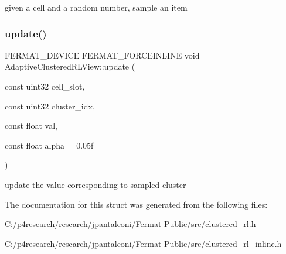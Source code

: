 given a cell and a random number, sample an item \mbox{\label{struct_adaptive_clustered_r_l_view_a2d22060ad6f9a30598f0ad657bf73171}} 
\subsubsection{\texorpdfstring{update()}{update()}}
{\footnotesize\ttfamily F\+E\+R\+M\+A\+T\+\_\+\+D\+E\+V\+I\+CE F\+E\+R\+M\+A\+T\+\_\+\+F\+O\+R\+C\+E\+I\+N\+L\+I\+NE void Adaptive\+Clustered\+R\+L\+View\+::update (\begin{DoxyParamCaption}\item[{const uint32}]{cell\+\_\+slot,  }\item[{const uint32}]{cluster\+\_\+idx,  }\item[{const float}]{val,  }\item[{const float}]{alpha = {\ttfamily 0.05f} }\end{DoxyParamCaption})}

update the value corresponding to sampled cluster 

The documentation for this struct was generated from the following files\+:\begin{DoxyCompactItemize}
\item 
C\+:/p4research/research/jpantaleoni/\+Fermat-\/\+Public/src/clustered\+\_\+rl.\+h\item 
C\+:/p4research/research/jpantaleoni/\+Fermat-\/\+Public/src/clustered\+\_\+rl\+\_\+inline.\+h\end{DoxyCompactItemize}
